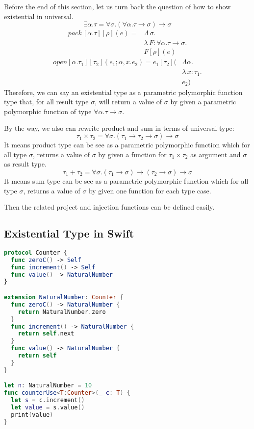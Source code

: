 \documentclass{article}
\begin{document}
Before the end of this section, let us turn back the question of how to show existential in universal.
\begin{equation*}
\exists\alpha.\tau = \forall \sigma. (\forall \alpha.\tau \rightarrow \sigma) \rightarrow \sigma
\end{equation*}
\begin{align*}
pack\, [\alpha.\tau][\rho](e) = &\Lambda\,\sigma.\\
&\lambda\,F:\forall\alpha.\tau\rightarrow\sigma.\\
&F[\rho](e)
\end{align*}
\begin{align*}
open[\alpha.\tau_{1}][\tau_{2}](e_{1};\alpha,x.e_{2}) = 
e_{1}[\tau_{2}](&\Lambda\alpha.\\
&\lambda\,x:\tau_{1}.\\
&e_{2})
\end{align*}
Therefore, we can say an existential type as a parametric polymorphic function type that, for all result type $\sigma$, will return a value of $\sigma$ by given a parametric polymorphic function of type $\forall \alpha.\tau \rightarrow \sigma$. 


By the way, we also can rewrite product and sum in terms of universal type:
\begin{equation*}
\tau_{1}\times \tau_{2} = \forall\sigma. (\tau_{1}\rightarrow\tau_{2}\rightarrow\sigma)\rightarrow \sigma
\end{equation*}
It means product type can be see as a parametric polymorphic function which for all type $\sigma$, returns a value of $\sigma$ by given a function for $\tau_{1}\times\tau_{2}$ as argument and $\sigma$ as result type.
\begin{equation*}
\tau_{1}+ \tau_{2} = \forall\sigma. (\tau_{1}\rightarrow\sigma)\rightarrow(\tau_{2}\rightarrow\sigma)\rightarrow \sigma
\end{equation*}
It means sum type can be see as a parametric polymorphic function which for all type $\sigma$, returns a value of $\sigma$ by given one function for each type case.


Then the related project and injection functions can be defined easily.


\subsection*{Existential Type in Swift}
\begin{lstlisting}[language=Swift]
protocol Counter {
  func zeroC() -> Self
  func increment() -> Self
  func value() -> NaturalNumber
}

extension NaturalNumber: Counter {
  func zeroC() -> NaturalNumber {
    return NaturalNumber.zero
  }
  func increment() -> NaturalNumber {
    return self.next
  }
  func value() -> NaturalNumber {
    return self
  }
}

let n: NaturalNumber = 10
func counterUse<T:Counter>(_ c: T) {
  let s = c.increment()
  let value = s.value()
  print(value)
}
\end{lstlisting}
\end{document}
